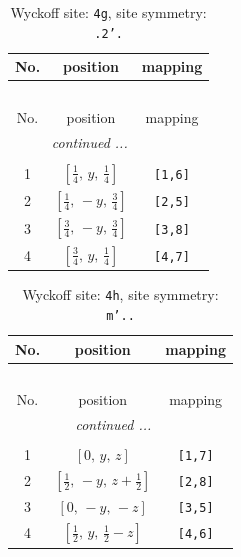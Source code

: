 \documentclass[fleqn,8pt]{jsarticle}
\begin{document}
\renewcommand{\arraystretch}{1.2}
\begin{longtable}{ccc}
\caption{Wyckoff site: {\tt 4g}, site symmetry: {\tt .2'.}}
 \\
 \hline \hline
No. & position & mapping \\ \hline \endfirsthead

\multicolumn{2}{l}{\tablename\ \thetable{}} \\
 \hline \hline
No. & position & mapping \\ \hline \endhead

 \hline \hline
\multicolumn{2}{r}{\footnotesize\it continued ...} \\ \endfoot

 \hline \hline
\multicolumn{2}{r}{} \\ \endlastfoot

1 & $\left[ \frac{1}{4},\, y,\, \frac{1}{4} \right]$ & {\tt [1,6]} \\ \hline
2 & $\left[ \frac{1}{4},\, - y,\, \frac{3}{4} \right]$ & {\tt [2,5]} \\ \hline
3 & $\left[ \frac{3}{4},\, - y,\, \frac{3}{4} \right]$ & {\tt [3,8]} \\ \hline
4 & $\left[ \frac{3}{4},\, y,\, \frac{1}{4} \right]$ & {\tt [4,7]} \\
\end{longtable}
\renewcommand{\arraystretch}{1.2}
\begin{longtable}{ccc}
\caption{Wyckoff site: {\tt 4h}, site symmetry: {\tt m'..}}
 \\
 \hline \hline
No. & position & mapping \\ \hline \endfirsthead

\multicolumn{2}{l}{\tablename\ \thetable{}} \\
 \hline \hline
No. & position & mapping \\ \hline \endhead

 \hline \hline
\multicolumn{2}{r}{\footnotesize\it continued ...} \\ \endfoot

 \hline \hline
\multicolumn{2}{r}{} \\ \endlastfoot

1 & $\left[ 0,\, y,\, z \right]$ & {\tt [1,7]} \\ \hline
2 & $\left[ \frac{1}{2},\, - y,\, z + \frac{1}{2} \right]$ & {\tt [2,8]} \\ \hline
3 & $\left[ 0,\, - y,\, - z \right]$ & {\tt [3,5]} \\ \hline
4 & $\left[ \frac{1}{2},\, y,\, \frac{1}{2} - z \right]$ & {\tt [4,6]} \\
\end{longtable}
\end{document}
